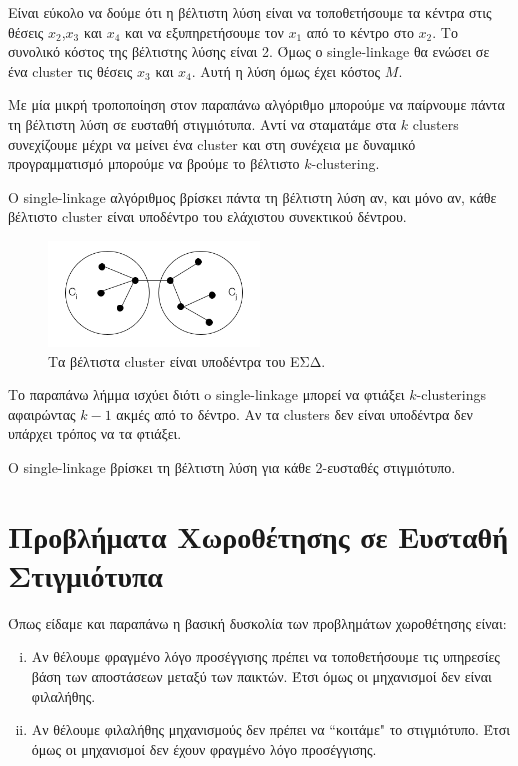 Είναι εύκολο να δούμε ότι η βέλτιστη λύση είναι να τοποθετήσουμε τα κέντρα στις θέσεις $x_2$,$x_3$ και $x_4$ και να εξυπηρετήσουμε τον $x_1$ από το κέντρο στο $x_2$. Το συνολικό κόστος της βέλτιστης λύσης είναι 2. Όμως ο single-linkage θα ενώσει σε ένα cluster τις θέσεις $x_3$ και $x_4$. Αυτή η λύση όμως έχει κόστος $M$.

Με μία μικρή τροποποίηση στον παραπάνω αλγόριθμο μπορούμε να παίρνουμε πάντα τη βέλτιστη λύση σε ευσταθή στιγμιότυπα. Αντί να σταματάμε στα $k$ clusters συνεχίζουμε μέχρι να μείνει ένα cluster και στη συνέχεια με δυναμικό προγραμματισμό μπορούμε να βρούμε το βέλτιστο $k$-clustering.

\begin{lemmagr} 
O single-linkage αλγόριθμος βρίσκει πάντα τη βέλτιστη λύση αν, και μόνο αν, κάθε βέλτιστο cluster είναι υποδέντρο του ελάχιστου συνεκτικού δέντρου.
\end{lemmagr}

\begin{figure}[ht]
    \centering
    \includegraphics[width=0.5\textwidth]{Images/MSTconnected.png}
    \caption{Τα βέλτιστα cluster είναι υποδέντρα του ΕΣΔ.}
    \label{fig:MSTCon}
\end{figure}

Το παραπάνω λήμμα ισχύει διότι o single-linkage μπορεί να φτιάξει $k$-clusterings αφαιρώντας $k-1$ ακμές από το δέντρο. Αν τα clusters δεν είναι υποδέντρα δεν υπάρχει τρόπος να τα φτιάξει.

\begin{lemmagr}
Ο single-linkage βρίσκει τη βέλτιστη λύση για κάθε 2-ευσταθές στιγμιότυπο.  
\end{lemmagr}


\section{Προβλήματα Χωροθέτησης σε Ευσταθή Στιγμιότυπα}

Όπως είδαμε και παραπάνω η βασική δυσκολία των προβλημάτων χωροθέτησης είναι:
\begin{enumerate}[(i)]
    \item Αν θέλουμε φραγμένο λόγο προσέγγισης πρέπει να τοποθετήσουμε τις υπηρεσίες βάση των αποστάσεων μεταξύ των παικτών. Έτσι όμως οι μηχανισμοί δεν είναι φιλαλήθης. 
    \item  Αν θέλουμε φιλαλήθης μηχανισμούς δεν πρέπει να ``κοιτάμε" το στιγμιότυπο. Έτσι όμως οι μηχανισμοί δεν έχουν φραγμένο λόγο προσέγγισης.
\end{enumerate}

